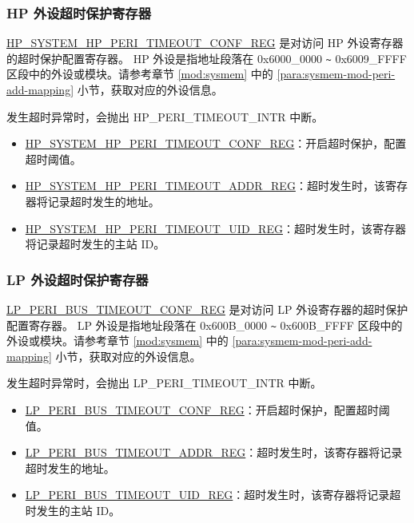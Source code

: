 \documentclass[main\_\_CN.tex]{subfiles}
\begin{document}
\subsubsection{HP 外设超时保护寄存器}

\hyperref[regdesc:HPSYSTEMHPPERITIMEOUTCONFREG]{HP\_SYSTEM\_HP\_PERI\_TIMEOUT\_CONF\_REG} 是对访问 HP 外设寄存器的超时保护配置寄存器。
HP 外设是指地址段落在 0x6000\_0000 \verb+~+ 0x6009\_FFFF 区段中的外设或模块。请参考章节 \ref{mod:sysmem} \textit{} 中的 \ref{para:sysmem-mod-peri-add-mapping} \textit{} 小节，获取对应的外设信息。

发生超时异常时，会抛出 HP\_PERI\_TIMEOUT\_INTR 中断。

\begin{itemize}
    \item \hyperref[regdesc:HPSYSTEMHPPERITIMEOUTCONFREG]{HP\_SYSTEM\_HP\_PERI\_TIMEOUT\_CONF\_REG}：开启超时保护，配置超时阈值。
    \item \hyperref[regdesc:HPSYSTEMHPPERITIMEOUTADDRREG]{HP\_SYSTEM\_HP\_PERI\_TIMEOUT\_ADDR\_REG}：超时发生时，该寄存器将记录超时发生的地址。
    \item \hyperref[regdesc:HPSYSTEMHPPERITIMEOUTUIDREG]{HP\_SYSTEM\_HP\_PERI\_TIMEOUT\_UID\_REG}：超时发生时，该寄存器将记录超时发生的主站 ID。
\end{itemize}

\subsubsection{LP 外设超时保护寄存器}

\hyperref[regdesc:LPPERIBUSTIMEOUTCONFREG]{LP\_PERI\_BUS\_TIMEOUT\_CONF\_REG} 是对访问 LP 外设寄存器的超时保护配置寄存器。
LP 外设是指地址段落在 0x600B\_0000 \verb+~+ 0x600B\_FFFF 区段中的外设或模块。请参考章节 \ref{mod:sysmem} \textit{} 中的 \ref{para:sysmem-mod-peri-add-mapping} \textit{} 小节，获取对应的外设信息。

发生超时异常时，会抛出 LP\_PERI\_TIMEOUT\_INTR 中断。

\begin{itemize}
    \item \hyperref[regdesc:LPPERIBUSTIMEOUTCONFREG]{LP\_PERI\_BUS\_TIMEOUT\_CONF\_REG}：开启超时保护，配置超时阈值。
    \item \hyperref[regdesc:LPPERIBUSTIMEOUTADDRREG]{LP\_PERI\_BUS\_TIMEOUT\_ADDR\_REG}：超时发生时，该寄存器将记录超时发生的地址。
    \item \hyperref[regdesc:LPPERIBUSTIMEOUTUIDREG]{LP\_PERI\_BUS\_TIMEOUT\_UID\_REG}：超时发生时，该寄存器将记录超时发生的主站 ID。
\end{itemize}
\end{document}
